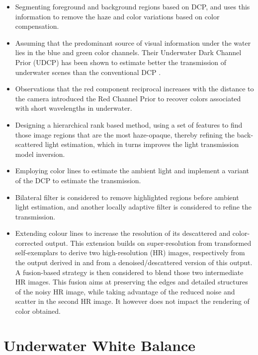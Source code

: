 \documentclass[hidelinks, 12pt]{report}
\begin{document}
\begin{itemize}
\item{Segmenting foreground and background regions based on DCP, and uses this information to remove the haze and color variations based on color compensation.}
\item{Assuming that the predominant source of visual information under the water lies in the blue and green color channels. Their Underwater Dark Channel Prior (UDCP) has been shown to estimate better the transmission of underwater scenes than the conventional DCP .}
\item{Observations that the red component reciprocal increases with the distance to the camera introduced the Red Channel Prior to recover colors associated with short wavelengths in underwater.}
\item{Designing a hierarchical rank based method, using a set of features to find those image regions that are the most haze-opaque, thereby refining the back-scattered light estimation, which in turns improves the light transmission model inversion.}
\item{Employing color lines to estimate the ambient light and implement a variant of the DCP to estimate the transmission.}
\item{Bilateral filter is considered to remove highlighted regions before ambient light estimation, and another locally adaptive filter is considered to refine the transmission.}
\item{Extending colour lines to increase the resolution of its descattered and color-corrected output. This extension builds on super-resolution from transformed self-exemplars to derive two high-resolution (HR) images, respectively from the output derived in and from a denoised/descattered version of this output. A fusion-based strategy is then considered to blend those two intermediate HR images. This fusion aims at preserving the edges and detailed structures of the noisy HR image, while taking advantage of the reduced noise and scatter in the second HR image. It however does not impact the rendering of color obtained.}
\end{itemize}
\chapter{Underwater White Balance}
\fancyhf{}
\fancyhead[r]{%
   \itshape
\footnotesize{\chaptermark}
   \leftmark}
\end{document}

